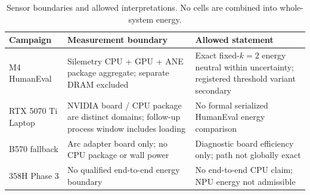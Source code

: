 \begin{table}[t]
\caption{Sensor boundaries and allowed interpretations. No cells are combined into whole-system energy.}
\label{tab:energy}
\centering
\begin{tabular}{>{\raggedright\arraybackslash}p{1.35in}>{\raggedright\arraybackslash}p{2.1in}>{\raggedright\arraybackslash}p{2.45in}}
\toprule
Campaign & Measurement boundary & Allowed statement \\
\midrule
M4 HumanEval & Silemetry CPU + GPU + ANE package aggregate; separate DRAM excluded & Exact fixed-$k=2$ energy neutral within uncertainty; registered threshold variant secondary \\
RTX 5070 Ti Laptop & NVIDIA board / CPU package are distinct domains; follow-up process window includes loading & No formal serialized HumanEval energy comparison \\
B570 fallback & Arc adapter board only; no CPU package or wall power & Diagnostic board efficiency only; path not globally exact \\
358H Phase 3 & No qualified end-to-end energy boundary & No end-to-end CPU claim; NPU energy not admissible \\
\bottomrule
\end{tabular}
\end{table}
